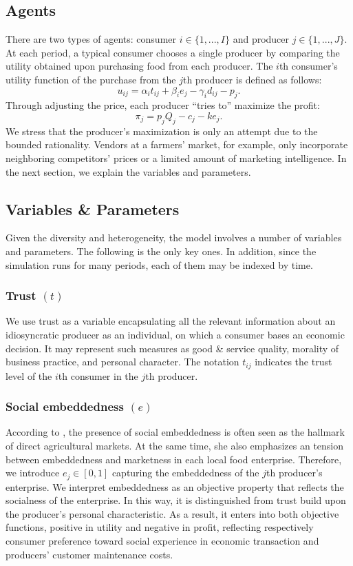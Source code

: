 \documentclass[11pt, oneside]{article}
\begin{document}
\subsection{Agents}
There are two types of agents: consumer $i \in \{1,...,I\}$ and producer $j \in \{1,...,J\}$. At each period, a typical consumer chooses a single producer by comparing the utility obtained upon purchasing food from each producer. The $i$th consumer's utility function of the purchase from the $j$th producer is defined as follows:
\begin{equation} \label{util}
  u_{ij} = \alpha_i t_{ij} + \beta_i e_j - \gamma_i d_{ij} - p_j .
\end{equation}
Through adjusting the price, each producer ``tries to'' maximize the profit:
\begin{equation}  \label{profit}
  \pi_j = p_j Q_j - c_j - k e_j .
\end{equation}
We stress that the producer's maximization is only an attempt due to the bounded rationality. Vendors at a farmers' market, for example, only incorporate neighboring competitors' prices or a limited amount of marketing intelligence. In the next section, we explain the variables and parameters.

\subsection{Variables \& Parameters}
Given the diversity and heterogeneity, the model involves a number of variables and parameters. The following is the only key ones. In addition, since the simulation runs for many periods, each of them may be indexed by time.

\subsubsection{Trust $(t)$}
We use trust as a variable encapsulating all the relevant information about an idiosyncratic producer as an individual, on which a consumer bases an economic decision. It may represent such measures as good \& service quality, morality of business practice, and personal character. The notation $t_{ij}$ indicates the trust level of the $i$th consumer in the $j$th producer.

\subsubsection{Social embeddedness $(e)$}
According to \textcite{Hinrichs2000}, the presence of social embeddedness is often seen as the hallmark of direct agricultural markets. At the same time, she also emphasizes an tension between embeddedness and marketness in each local food enterprise. Therefore, we introduce $e_j \in [0,1]$ capturing the embeddedness of the $j$th producer's enterprise. We interpret embeddedness as an objective property that reflects the socialness of the enterprise. In this way, it is distinguished from trust build upon the producer's personal characteristic. As a result, it enters into both objective functions, positive in utility and negative in profit, reflecting respectively consumer preference toward social experience in economic transaction and producers' customer maintenance costs.
\end{document}
